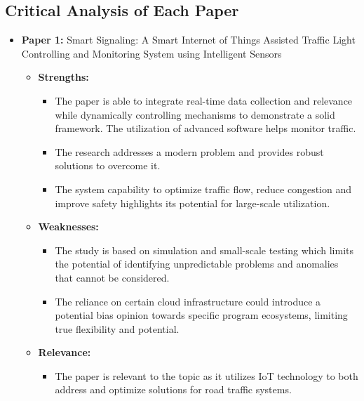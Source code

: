 \documentclass[12pt,a4paper]{article}
\begin{document}
\subsection{Critical Analysis of Each Paper}

\begin{itemize}
    \item \textbf{Paper 1:} Smart Signaling: A Smart Internet of Things Assisted Traffic Light Controlling and Monitoring System using Intelligent Sensors
    
    \begin{itemize}
    
        \item \textbf{Strengths:}
        
        \begin{itemize}
            \item The paper is able to integrate real-time data collection and relevance while dynamically controlling mechanisms to demonstrate a solid framework. The utilization of advanced software helps monitor traffic. 
            \item The research addresses a modern problem and provides robust solutions to overcome it. 
            \item The system capability to optimize traffic flow, reduce congestion and improve safety highlights its potential for large-scale utilization.
        \end{itemize}
        
        \item \textbf{Weaknesses:} 
        
        \begin{itemize}
            \item The study is based on simulation and small-scale testing which limits the potential of identifying unpredictable problems and anomalies that cannot be considered. 
            \item The reliance on certain cloud infrastructure could introduce a potential bias opinion towards specific program ecosystems, limiting true flexibility and potential. 
        \end{itemize}
        
        \item \textbf{Relevance: } 
        
        \begin{itemize}
            \item The paper is relevant to the topic as it utilizes IoT technology to both address and optimize solutions for road traffic systems. 
        \end{itemize}
    \end{itemize}
    

\end{itemize}
\end{document}
